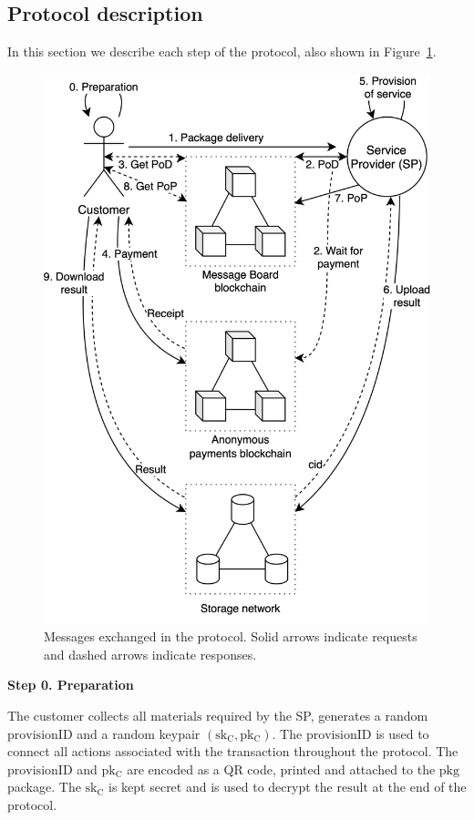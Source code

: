 \documentclass[pdftex,twocolumn,epjc3]{svjour3}
\begin{document}
{\subsection{Protocol description}\label{protocol-description}

In this section we describe each step of the protocol, also shown in Figure~\ref{fig:protocol-diagram}.

\begin{figure}[ht!]
\includegraphics[width=\linewidth]{anonser-protocol.png}
\centering
\caption{Messages exchanged in the protocol. Solid arrows indicate requests and dashed arrows indicate responses.}
\label{fig:protocol-diagram}
\end{figure}

\noindent \textbf
{Step 0.  Preparation}\label{step-0-preparation}

The customer collects all $\mathrm{materials}$ required by the SP, generates a random $\mathrm{provisionID}$ and a random keypair $(\mathrm{sk_C},\mathrm{pk_C})$. The $\mathrm{provisionID}$ is used to connect all actions associated with the transaction throughout the protocol. The $\mathrm{provisionID}$ and $\mathrm{pk_C}$ are encoded as a QR code, printed and attached to the $\mathrm{pkg}$ package. The $\mathrm{sk_C}$ is kept secret and is used to decrypt the $\mathrm{result}$ at the end of the protocol.

}
\end{document}
